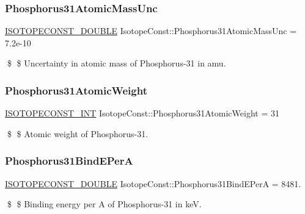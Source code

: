 \subsubsection{\texorpdfstring{Phosphorus31\+Atomic\+Mass\+Unc}{Phosphorus31AtomicMassUnc}}
{\footnotesize\ttfamily \mbox{\hyperlink{group___isotope_const-_macros_ga8f45a7272ce02c0b4c65c44636ed719a}{I\+S\+O\+T\+O\+P\+E\+C\+O\+N\+S\+T\+\_\+\+D\+O\+U\+B\+LE}} Isotope\+Const\+::\+Phosphorus31\+Atomic\+Mass\+Unc = 7.\+2e-\/10}

\$ \$ Uncertainty in atomic mass of Phosphorus-\/31 in amu. \mbox{\label{group___isotope_const-_phosphorus-_p31_ga5219ac33a0440912ba38db9c1a6091a3}} 
\subsubsection{\texorpdfstring{Phosphorus31\+Atomic\+Weight}{Phosphorus31AtomicWeight}}
{\footnotesize\ttfamily \mbox{\hyperlink{group___isotope_const-_macros_ga5f18360b3e99483a35c32d789e62621c}{I\+S\+O\+T\+O\+P\+E\+C\+O\+N\+S\+T\+\_\+\+I\+NT}} Isotope\+Const\+::\+Phosphorus31\+Atomic\+Weight = 31}

\$ \$ Atomic weight of Phosphorus-\/31. \mbox{\label{group___isotope_const-_phosphorus-_p31_ga53f9df59cba39430d86f85f97181fc6f}} 
\subsubsection{\texorpdfstring{Phosphorus31\+Bind\+E\+PerA}{Phosphorus31BindEPerA}}
{\footnotesize\ttfamily \mbox{\hyperlink{group___isotope_const-_macros_ga8f45a7272ce02c0b4c65c44636ed719a}{I\+S\+O\+T\+O\+P\+E\+C\+O\+N\+S\+T\+\_\+\+D\+O\+U\+B\+LE}} Isotope\+Const\+::\+Phosphorus31\+Bind\+E\+PerA = 8481.}

\$ \$ Binding energy per A of Phosphorus-\/31 in keV. \mbox{\label{group___isotope_const-_phosphorus-_p31_ga958949bdd146ecaf8154c98d98d9b923}} 
